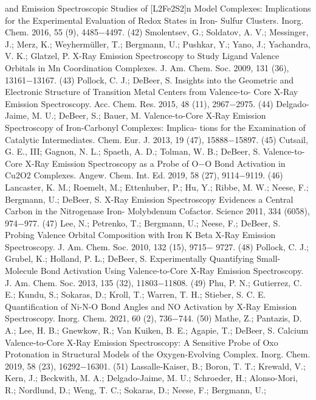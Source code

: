 \documentclass{article}
\begin{document}
\newpage


and Emission Spectroscopic Studies of [L2Fe2S2]n Model Complexes:
Implications for the Experimental Evaluation of Redox States in Iron-
Sulfur Clusters. Inorg. Chem. 2016, 55 (9), 4485−4497.
(42) Smolentsev, G.; Soldatov, A. V.; Messinger, J.; Merz, K.;
Weyhermüller, T.; Bergmann, U.; Pushkar, Y.; Yano, J.; Yachandra, V.
K.; Glatzel, P. X-Ray Emission Spectroscopy to Study Ligand Valence
Orbitals in Mn Coordination Complexes. J. Am. Chem. Soc. 2009, 131
(36), 13161−13167.
(43) Pollock, C. J.; DeBeer, S. Insights into the Geometric and
Electronic Structure of Transition Metal Centers from Valence-to-
Core X-Ray Emission Spectroscopy. Acc. Chem. Res. 2015, 48 (11),
2967−2975.
(44) Delgado-Jaime, M. U.; DeBeer, S.; Bauer, M. Valence-to-Core
X-Ray Emission Spectroscopy of Iron-Carbonyl Complexes: Implica-
tions for the Examination of Catalytic Intermediates. Chem.Eur. J.
2013, 19 (47), 15888−15897.
(45) Cutsail, G. E., III; Gagnon, N. L.; Spaeth, A. D.; Tolman, W. B.;
DeBeer, S. Valence-to-Core X-Ray Emission Spectroscopy as a Probe
of O−O Bond Activation in Cu2O2 Complexes. Angew. Chem. Int. Ed.
2019, 58 (27), 9114−9119.
(46) Lancaster, K. M.; Roemelt, M.; Ettenhuber, P.; Hu, Y.; Ribbe,
M. W.; Neese, F.; Bergmann, U.; DeBeer, S. X-Ray Emission
Spectroscopy Evidences a Central Carbon in the Nitrogenase Iron-
Molybdenum Cofactor. Science 2011, 334 (6058), 974−977.
(47) Lee, N.; Petrenko, T.; Bergmann, U.; Neese, F.; DeBeer, S.
Probing Valence Orbital Composition with Iron K Beta X-Ray
Emission Spectroscopy. J. Am. Chem. Soc. 2010, 132 (15), 9715−
9727.
(48) Pollock, C. J.; Grubel, K.; Holland, P. L.; DeBeer, S.
Experimentally Quantifying Small-Molecule Bond Activation Using
Valence-to-Core X-Ray Emission Spectroscopy. J. Am. Chem. Soc.
2013, 135 (32), 11803−11808.
(49) Phu, P. N.; Gutierrez, C. E.; Kundu, S.; Sokaras, D.; Kroll, T.;
Warren, T. H.; Stieber, S. C. E. Quantification of Ni-N-O Bond
Angles and NO Activation by X-Ray Emission Spectroscopy. Inorg.
Chem. 2021, 60 (2), 736−744.
(50) Mathe, Z.; Pantazis, D. A.; Lee, H. B.; Gnewkow, R.; Van
Kuiken, B. E.; Agapie, T.; DeBeer, S. Calcium Valence-to-Core X-Ray
Emission Spectroscopy: A Sensitive Probe of Oxo Protonation in
Structural Models of the Oxygen-Evolving Complex. Inorg. Chem.
2019, 58 (23), 16292−16301.
(51) Lassalle-Kaiser, B.; Boron, T. T.; Krewald, V.; Kern, J.;
Beckwith, M. A.; Delgado-Jaime, M. U.; Schroeder, H.; Alonso-Mori,
R.; Nordlund, D.; Weng, T. C.; Sokaras, D.; Neese, F.; Bergmann, U.;
\end{document}
